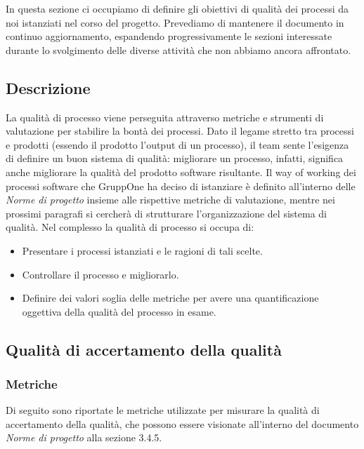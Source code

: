 \documentclass[../piano-di-qualifica.tex]{subfiles}
\begin{document}
In questa sezione ci occupiamo di definire gli obiettivi di qualità dei processi da noi istanziati nel corso del progetto.
Prevediamo di mantenere il documento in continuo aggiornamento, espandendo progressivamente le sezioni interessate durante lo svolgimento delle diverse attività che non abbiamo ancora affrontato.

\subsection{Descrizione}%
\label{sub:descrizione}

La qualità di processo viene perseguita attraverso metriche e strumenti di valutazione per stabilire la bontà dei processi.
Dato il legame stretto tra processi e prodotti (essendo il prodotto l'output di un processo), il team sente l'esigenza di definire un buon sistema di qualità: migliorare un processo, infatti, significa anche migliorare la qualità del prodotto software risultante.
Il way of working dei processi software che GruppOne ha deciso di istanziare è definito all'interno delle \textit{Norme di progetto} insieme alle rispettive metriche di valutazione, mentre nei prossimi paragrafi si cercherà di strutturare l'organizzazione del sistema di qualità.
Nel complesso la qualità di processo si occupa di:
\begin{itemize}
  \item Presentare i processi istanziati e le ragioni di tali scelte.
  \item Controllare il processo e migliorarlo.
  \item Definire dei valori soglia delle metriche per avere una quantificazione oggettiva della qualità del processo in esame.
\end{itemize}


\subsection{Qualità di accertamento della qualità}%
\label{subsec:qualita_accertamento_qualita}

\subsubsection{Metriche}%
\label{subsec:metriche_aq}
Di seguito sono riportate le metriche utilizzate per misurare la qualità di accertamento della qualità, che possono essere visionate all'interno del documento \textit{Norme di progetto} alla sezione 3.4.5.
\end{document}
